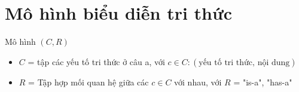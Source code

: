 \section{Mô hình biểu diễn tri thức} 
Mô hình $(C, R)$

\begin{itemize}
	\item $C$ =  tập các yếu tố tri thức ở câu a,
	với $c \in C: (\text{yếu tố tri thức, nội dung})$
	
	\item $R$ = Tập hợp mối quan hệ giữa các $c \in C$ với nhau, 
	với $R$ = {"is-a", "has-a"}
\end{itemize}



